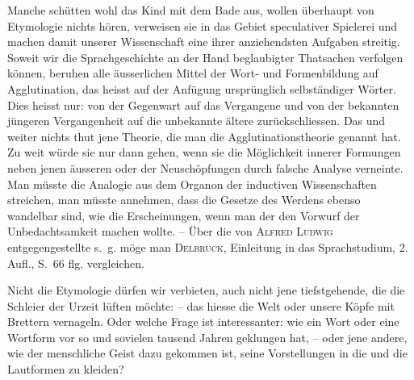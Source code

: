 {\largerpage[-1]Manche schütten wohl das Kind mit dem Bade aus, wollen überhaupt von Etymologie nichts hören, verweisen sie in das Gebiet speculativer Spielerei und machen damit unserer Wissenschaft eine ihrer anziehendsten Aufgaben streitig. Soweit wir die Sprachgeschichte an der Hand beglaubigter Thatsachen verfolgen können, beruhen alle äusserlichen Mittel der Wort- und Formenbildung auf Agglutination, das heisst auf der Anfügung ursprünglich selbständiger Wörter. Dies  heisst nur: von der Gegenwart auf das Vergangene und von der bekannten jüngeren Vergangenheit auf die unbekannte ältere zurück\label{fp.190}schliessen. Das und weiter nichts thut jene Theorie, die man die Ag\-glutinationstheorie genannt hat. Zu weit würde sie nur dann gehen, wenn sie die Möglichkeit innerer Formungen neben jenen äusseren oder der Neuschöpfungen durch falsche Analyse verneinte. Man müsste die Analogie aus dem Organon der inductiven Wissenschaften streichen, man müsste annehmen, dass die Gesetze des Werdens ebenso wandelbar sind, wie die Erscheinungen, wenn man der  den Vorwurf der Unbedachtsamkeit machen wollte.  – Über die von \textsc{Alfred Ludwig} entgegengestellte s.~g.  möge man \textsc{Delbrück}, Einleitung in das Sprachstudium, 2. Aufl., S.~66 flg. vergleichen.

Nicht die Etymologie dürfen wir verbieten, auch nicht jene tiefstgehende, die die Schleier der Urzeit lüften möchte: – das hiesse die Welt oder unsere Köpfe mit Brettern vernageln. Oder welche Frage ist interessanter: wie ein Wort oder eine Wortform vor so und sovielen tausend Jahren geklungen hat, – oder jene andere, wie der menschliche Geist dazu gekommen ist, seine Vorstellungen in die und die Lautformen zu kleiden?

}
